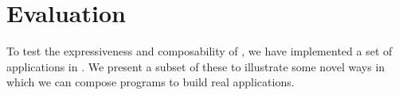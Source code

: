 \documentclass[letterpaper,twocolumn,10pt]{article}
\begin{document}





\section{Evaluation}
\label{sec:evaluation}
To test the expressiveness and composability of \ulang, we have
implemented a set of applications in \ulang. We present a subset of
these to illustrate some novel ways in which  we can compose \ulang
programs to build real applications.
\end{document}
